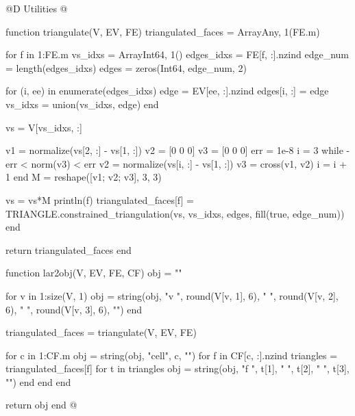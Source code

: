 @D Utilities
@{function triangulate(V, EV, FE)
    triangulated_faces = Array{Any, 1}(FE.m)

    for f in 1:FE.m
        vs_idxs = Array{Int64, 1}()
        edges_idxs = FE[f, :].nzind
        edge_num = length(edges_idxs)
        edges = zeros(Int64, edge_num, 2)

        for (i, ee) in enumerate(edges_idxs)
            edge = EV[ee, :].nzind
            edges[i, :] = edge
            vs_idxs = union(vs_idxs, edge)
        end
        
        vs = V[vs_idxs, :]

        v1 = normalize(vs[2, :] - vs[1, :])
        v2 = [0 0 0]
        v3 = [0 0 0]
        err = 1e-8
        i = 3
        while -err < norm(v3) < err
            v2 = normalize(vs[i, :] - vs[1, :])
            v3 = cross(v1, v2)
            i = i + 1
        end
        M = reshape([v1; v2; v3], 3, 3)

        vs = vs*M
        println(f)
        triangulated_faces[f] = TRIANGLE.constrained_triangulation(vs, vs_idxs, edges, fill(true, edge_num))
    end

    return triangulated_faces
end

function lar2obj(V, EV, FE, CF)
    obj = ""

    for v in 1:size(V, 1)
        obj = string(obj, "v ", round(V[v, 1], 6), " ", round(V[v, 2], 6), " ", round(V[v, 3], 6), "\n")
    end

    triangulated_faces = triangulate(V, EV, FE)

    for c in 1:CF.m
        obj = string(obj, "\ng cell", c, "\n")
        for f in CF[c, :].nzind
            triangles = triangulated_faces[f]
            for t in triangles
                obj = string(obj, "f ", t[1], " ", t[2], " ", t[3], "\n")
            end
        end
    end

    return obj
end
@}